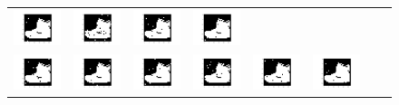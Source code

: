 \documentclass[12pt]{report}
\begin{document}
\begin{figure}[H]
\begin{tabular}{cccccccc}
  \includegraphics[width=0.15\linewidth]{21.png} &   \includegraphics[width=0.15\linewidth]{22.png} &
  \includegraphics[width=0.15\linewidth]{23.png} &   \includegraphics[width=0.15\linewidth]{24.png} \\
  \includegraphics[width=0.15\linewidth]{25.png} &   \includegraphics[width=0.15\linewidth]{26.png} &
  \includegraphics[width=0.15\linewidth]{27.png} &   \includegraphics[width=0.15\linewidth]{28.png} &
  \includegraphics[width=0.15\linewidth]{29.png} &   \includegraphics[width=0.15\linewidth]{30.png} \\

\end{tabular}
\end{figure}
\end{document}

